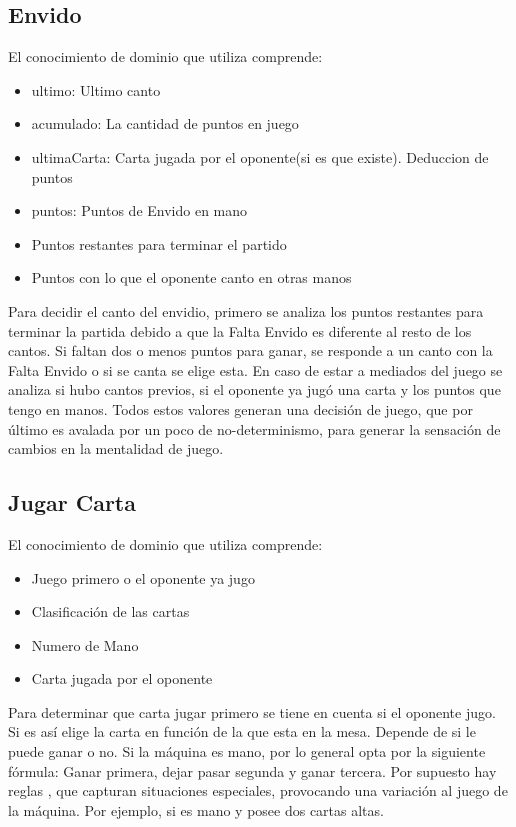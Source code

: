 \documentclass[12pt,a4paper]{article}
\begin{document}
\subsection{Envido}
El conocimiento de dominio que utiliza comprende:
\begin{itemize}
\item ultimo: Ultimo canto 
\item acumulado: La cantidad de puntos en juego
\item ultimaCarta: Carta jugada por el oponente(si es que existe). Deduccion de puntos
\item puntos: Puntos de Envido en mano
\item Puntos restantes para terminar el partido
\item Puntos con lo que el oponente canto en otras manos
\end{itemize}

Para decidir el canto del envidio, primero se analiza los puntos restantes para terminar la partida debido a que la Falta Envido es diferente al 
resto de los cantos. Si faltan dos o menos puntos para ganar, se responde a un canto con la Falta Envido o si se canta se elige esta.
En caso de estar a mediados del juego se analiza si hubo cantos previos, si el oponente ya jug\'o una carta y los puntos que tengo en manos. 
Todos estos valores generan una decisi\'on de juego, que por \'ultimo es avalada por un poco de  no-determinismo, para generar la sensaci\'on 
de cambios en la mentalidad de juego. 




\subsection{Jugar Carta}
El conocimiento de dominio que utiliza comprende:
\begin{itemize}
\item Juego primero o  el oponente ya jugo
\item Clasificaci\'on de las cartas
\item Numero de Mano
\item Carta jugada por el oponente
\end{itemize}

Para determinar que carta jugar primero se tiene en cuenta si el oponente jugo. Si es as\'i elige la carta en 
funci\'on de la que esta en la mesa. Depende de si le puede ganar o no.
Si la m\'aquina es mano, por lo general opta por la siguiente f\'ormula: Ganar primera, dejar pasar segunda y ganar tercera. 
Por supuesto hay reglas , que capturan situaciones especiales, provocando una variaci\'on al juego de la m\'aquina. Por ejemplo, si es mano y posee dos cartas altas.
\end{document}
